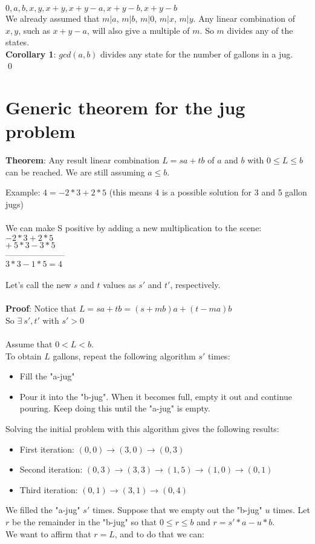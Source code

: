 \documentclass{article}
\begin{document}
	$0, a, b, x, y, x + y, x + y - a, x + y - b, x + y - b$
	\\
	We already assumed that $m | a$, $m | b$, $m | 0$, $m | x$, $m | y$. Any linear combination of $x, y$, such as $x + y - a$, will also give a multiple of $m$. So $m$ divides any of the states.
	\\
	\textbf{Corollary 1}: $gcd(a, b)$ divides any state for the number of gallons in a jug.
	\\
	\qed
	
	\pagebreak
	
	\section{Generic theorem for the jug problem}
	\textbf{Theorem}: Any result linear combination $L = sa + tb$ of $a$ and $b$ with $0 \leq L \leq b$ can be reached. We are still assuming $a \leq b$.
	
	Example: $4 = -2 * 3 + 2 * 5$ (this means 4 is a possible solution for 3 and 5 gallon jugs)\\
	\\
	We can make S positive by adding a new multiplication to the scene: \\
	$-2 * 3 + 2 * 5$\\
	$+\ 5 * 3 - 3 * 5$\\
	---------------------\\
	$3 * 3 - 1 * 5 = 4$
	\\
	\\
	Let's call the new $s$ and $t$ values as $s'$ and $t'$, respectively.
	\\
	\\
	\textbf{Proof}: Notice that $L = sa + tb = (s + mb)a + (t - ma)b$\\
	So $\exists\ s', t'$ with $s' > 0$\\
	\\
	Assume that $0 < L < b$.\\
	To obtain $L$ gallons, repeat the following algorithm $s'$ times:
	\begin{itemize}
		\item Fill the "a-jug"
		\item Pour it into the "b-jug". When it becomes full, empty it out and continue pouring. Keep doing this until the "a-jug" is empty.
	\end{itemize}
	
	Solving the initial problem with this algorithm gives the following results:
	\begin{itemize}
		\item First iteration: $(0, 0) \rightarrow (3, 0) \rightarrow (0, 3)$
		\item Second iteration: $(0, 3) \rightarrow (3, 3) \rightarrow (1, 5) \rightarrow (1, 0) \rightarrow (0, 1)$
		\item Third iteration: $(0, 1) \rightarrow (3, 1) \rightarrow (0, 4)$
	\end{itemize}
	We filled the "a-jug" $s'$ times. Suppose that we empty out the "b-jug" $u$ times. Let $r$ be the remainder in the "b-jug" so that $0 \leq r \leq b$ and $r = s' * a - u * b$.
	\\
	We want to affirm that $r = L$, and to do that we can:
	
\end{document}
